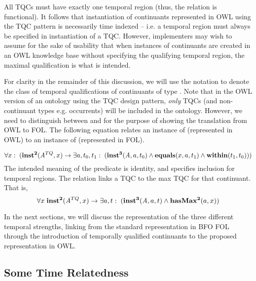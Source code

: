 All TQCs must have exactly one temporal region (thus, the  relation is functional). It follows that instantiation of continuants represented in OWL using the TQC pattern is necessarily time indexed -- i.e. a temporal region must always be specified in instantiation of a TQC. However, implementers may wish to assume for the sake of usability that when instances of continuants are created in an OWL knowledge base without specifying the qualifying temporal region, the maximal qualification is what is intended. 

For clarity in the remainder of this discussion, we will use the notation  to denote the class of temporal qualifications of
continuants of type . Note that in the OWL version of an ontology using the TQC design pattern, \emph{only} TQCs (and non-continuant types e.g. occurrents) will be included in the ontology. However, we need to distinguish between  and  for the purpose of showing the translation from OWL to FOL. The following equation relates an instance of  (represented in OWL) to an instance of  (represented in FOL). 

\begin{equation}
\forall x:\; (\mathrm{\mathbf{inst^2}}(\mathit{A}^{TQ},x) \rightarrow \exists a,t_0,t_1:\;(
\mathrm{\mathbf{inst^3}}(\mathit{A},a,t_0) \wedge \mathrm{\mathbf{equals}}(x,a,t_1) \wedge
\mathrm{\mathbf{within}}(t_1,t_0)))
\end{equation}
The intended meaning of the predicate  is identity, and  specifies inclusion for temporal regions.  
The relation  links a TQC to the max TQC for that continuant. That is,
\begin{equation}
\forall x\; \mathrm{\mathbf{inst^2}}(\mathit{A}^{TQ},x) \rightarrow \exists a,t:\;(
\mathrm{\mathbf{inst^3}}(\mathit{A}, a,t) \wedge \mathrm{\mathbf{hasMax^2}}(a,x))
\end{equation}

In the next sections, we will discuss the representation of the three different
temporal strengths, linking from the standard representation in BFO FOL through
the introduction of temporally qualified continuants to the proposed
representation in OWL.

\subsection*{Some Time Relatedness}

